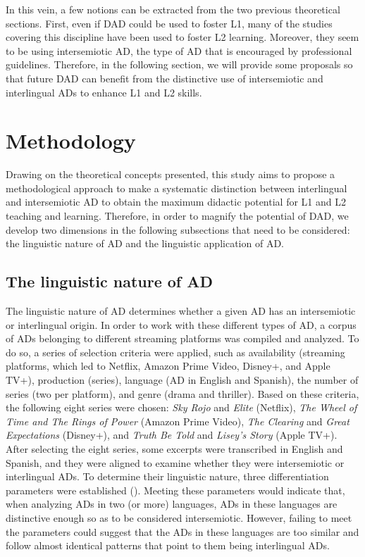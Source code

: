 \documentclass[english]{textolivre}
\begin{document}
In this vein, a few notions can be extracted from the two previous theoretical sections. First, even if DAD could be used to foster L1, many of the studies covering this discipline have been used to foster L2 learning. Moreover, they seem to be using intersemiotic AD, the type of AD that is encouraged by professional guidelines. Therefore, in the following section, we will provide some proposals so that future DAD can benefit from the distinctive use of intersemiotic and interlingual ADs to enhance L1 and L2 skills.


\section{Methodology}\label{sec-fmt-manuscrito}
Drawing on the theoretical concepts presented, this study aims to propose a methodological approach to make a systematic distinction between interlingual and intersemiotic AD to obtain the maximum didactic potential for L1 and L2 teaching and learning. Therefore, in order to magnify the potential of DAD, we develop two dimensions in the following subsections that need to be considered: the linguistic nature of AD and the linguistic application of AD.


\subsection{The linguistic nature of AD}\label{sec-formato}
The linguistic nature of AD determines whether a given AD has an intersemiotic or interlingual origin. In order to work with these different types of AD, a corpus of ADs belonging to different streaming platforms was compiled and analyzed. To do so, a series of selection criteria were applied, such as availability (streaming platforms, which led to Netflix, Amazon Prime Video, Disney+, and Apple TV+), production (series), language (AD in English and Spanish), the number of series (two per platform), and genre (drama and thriller). Based on these criteria, the following eight series were chosen: \textit{Sky Rojo} and \textit{Elite} (Netflix), \textit{The Wheel of Time and The Rings of Power} (Amazon Prime Video), \textit{The Clearing} and \textit{Great Expectations} (Disney+), and \textit{Truth Be Told} and \textit{Lisey’s Story} (Apple TV+). After selecting the eight series, some excerpts were transcribed in English and Spanish, and they were aligned to examine whether they were intersemiotic or interlingual ADs. To determine their linguistic nature, three differentiation parameters were established (). Meeting these parameters would indicate that, when analyzing ADs in two (or more) languages, ADs in these languages are distinctive enough so as to be considered intersemiotic. However, failing to meet the parameters could suggest that the ADs in these languages are too similar and follow almost identical patterns that point to them being interlingual ADs.
\end{document}
